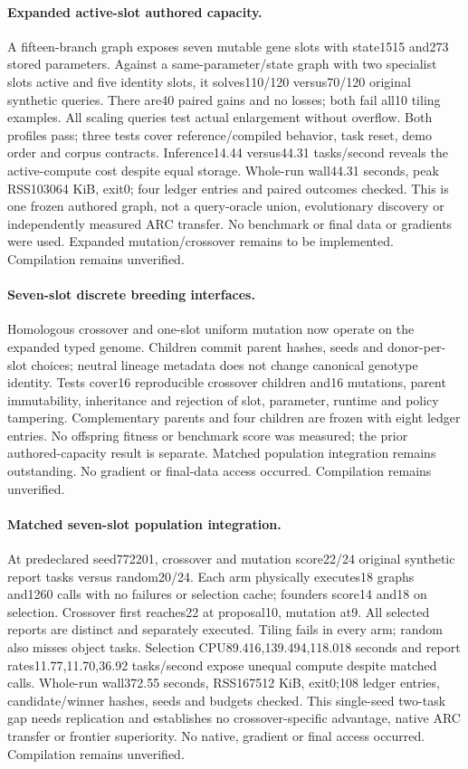 \documentclass[11pt]{article}
\begin{document}
\paragraph{Expanded active-slot authored capacity.}
A fifteen-branch graph exposes seven mutable gene slots with state1515 and273
stored parameters. Against a same-parameter/state graph with two specialist
slots active and five identity slots, it solves110/120 versus70/120 original
synthetic queries. There are40 paired gains and no losses; both fail all10
tiling examples. All scaling queries test actual enlargement without overflow.
Both profiles pass; three tests cover reference/compiled behavior, task reset,
demo order and corpus contracts. Inference14.44 versus44.31 tasks/second reveals
the active-compute cost despite equal storage. Whole-run wall44.31 seconds,
peak RSS103064 KiB, exit0; four ledger entries and paired outcomes checked.
This is one frozen authored graph, not a query-oracle union, evolutionary
discovery or independently measured ARC transfer. No benchmark or final data
or gradients were used. Expanded mutation/crossover remains to be implemented.
Compilation remains unverified.
\paragraph{Seven-slot discrete breeding interfaces.}
Homologous crossover and one-slot uniform mutation now operate on the expanded
typed genome. Children commit parent hashes, seeds and donor-per-slot choices;
neutral lineage metadata does not change canonical genotype identity. Tests
cover16 reproducible crossover children and16 mutations, parent immutability,
inheritance and rejection of slot, parameter, runtime and policy tampering.
Complementary parents and four children are frozen with eight ledger entries.
No offspring fitness or benchmark score was measured; the prior authored-capacity
result is separate. Matched population integration remains outstanding. No
gradient or final-data access occurred. Compilation remains unverified.
\paragraph{Matched seven-slot population integration.}
At predeclared seed772201, crossover and mutation score22/24 original synthetic
report tasks versus random20/24. Each arm physically executes18 graphs and1260
calls with no failures or selection cache; founders score14 and18 on selection.
Crossover first reaches22 at proposal10, mutation at9. All selected reports
are distinct and separately executed. Tiling fails in every arm; random also
misses object tasks. Selection CPU89.416,139.494,118.018 seconds and report
rates11.77,11.70,36.92 tasks/second expose unequal compute despite matched
calls. Whole-run wall372.55 seconds, RSS167512 KiB, exit0;108 ledger entries,
candidate/winner hashes, seeds and budgets checked. This single-seed two-task
gap needs replication and establishes no crossover-specific advantage, native
ARC transfer or frontier superiority. No native, gradient or final access
occurred. Compilation remains unverified.
\end{document}
